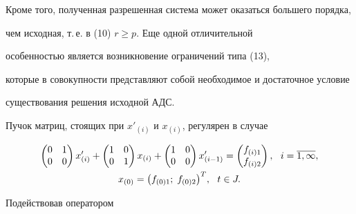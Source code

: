 Кроме того, полученная разрешенная система может оказаться большего порядка,


чем исходная, т.\,е. в (10) $r \ge p$. Еще одной отличительной 


особенностью является возникновение ограничений типа (13),


которые в совокупности представляют собой необходимое и достаточное условие


существования решения исходной АДС.





\begin{exam}


Пучок матриц, стоящих при $x'_{(i)}$ и $x_{(i)}$, регулярен в случае


\begin{gather}


\begin{pmatrix}


0 & 1\\  0 & 0 


\end{pmatrix} x'_{(i)}+


\begin{pmatrix}


 1 & 0\\ 0 & 1 


\end{pmatrix} x_{(i)}+


\begin{pmatrix}


 1 & 0\\ 0 & 0 


\end{pmatrix} x'_{(i-1)}=


\begin{pmatrix}


 f_{(i)1}\\ f_{(i)2}


\end{pmatrix},\ \ i=\overline{1,\infty}, \\


%


x_{(0)}=\big( f_{(0)1};\; f_{(0)2} \big)^T,


\ \ t \in J.\notag


\end{gather}





Подействовав оператором



\end{exam}
